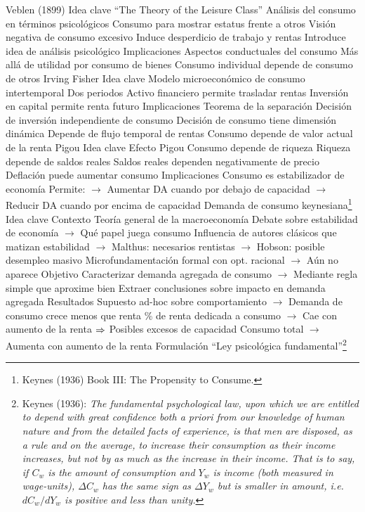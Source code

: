 \documentclass{nuevotema}
\begin{document}
\begin{esquemal}
		\2 Veblen (1899)
			\3 Idea clave
				\4 ``The Theory of the Leisure Class''
				\4 Análisis del consumo en términos psicológicos
				\4 Consumo para mostrar estatus frente a otros
				\4 Visión negativa de consumo excesivo
				\4[] Induce desperdicio de trabajo y rentas
				\4 Introduce idea de análisis psicológico
			\3 Implicaciones
				\4 Aspectos conductuales del consumo
				\4[] Más allá de utilidad por consumo de bienes
				\4 Consumo individual depende de consumo de otros
		\2 Irving Fisher
			\3 Idea clave
				\4 Modelo microeconómico de consumo intertemporal
				\4 Dos periodos
				\4 Activo financiero permite trasladar rentas
				\4 Inversión en capital permite renta futuro
			\3 Implicaciones
				\4 Teorema de la separación
				\4[] Decisión de inversión independiente de consumo
				\4 Decisión de consumo tiene dimensión dinámica
				\4[] Depende de flujo temporal de rentas
				\4 Consumo depende de valor actual de la renta
		\2 Pigou
			\3 Idea clave
				\4 Efecto Pigou
				\4[] Consumo depende de riqueza
				\4[] Riqueza depende de saldos reales
				\4[] Saldos reales dependen negativamente de precio
				\4[$\then$] Deflación puede aumentar consumo
			\3 Implicaciones
				\4 Consumo es estabilizador de economía
				\4[] Permite:
				\4[] $\to$ Aumentar DA cuando por debajo de capacidad
				\4[] $\to$ Reducir DA cuando por encima de capacidad
	\1 
		\2 Demanda de consumo keynesiana\footnote{Keynes (1936) Book III: The Propensity to Consume.}
			\3 Idea clave
				\4 Contexto
				\4[] Teoría general de la macroeconomía
				\4[] Debate sobre estabilidad de economía
				\4[] $\to$ Qué papel juega consumo
				\4[] Influencia de autores clásicos que matizan estabilidad
				\4[] $\to$ Malthus: necesarios rentistas
				\4[] $\to$ Hobson: posible desempleo masivo
				\4[] Microfundamentación formal con opt. racional
				\4[] $\to$ Aún no aparece
				\4 Objetivo
				\4[] Caracterizar demanda agregada de consumo
				\4[] $\to$ Mediante regla simple que aproxime bien
				\4[] Extraer conclusiones sobre impacto en demanda agregada
				\4 Resultados
				\4[] Supuesto ad-hoc sobre comportamiento
				\4[] $\to$ Demanda de consumo crece menos que renta
				\4[] \% de renta dedicada a consumo
				\4[] $\to$ Cae con aumento de la renta
				\4[] $\then$ Posibles excesos de capacidad
				\4[] Consumo total
				\4[] $\to$ Aumenta con aumento de la renta
			\3 Formulación
				\4 ``Ley psicológica fundamental''\footnote{Keynes (1936): \textit{The fundamental psychological law, upon which we are entitled to depend with great confidence both a priori from our knowledge of human nature and from the detailed facts of experience, is that men are disposed, as a rule and on the average, to increase their consumption as their income increases, but not by as much as the increase in their income. That is to say, if $C_w$ is the amount of consumption and $Y_w$ is income (both measured in wage-units), $\Delta C_w$ has the same sign as $\Delta Y_w$ but is smaller in amount, i.e. $d C_w /d Y_w$ is positive and less than unity.}}

\end{esquemal}
\end{document}
